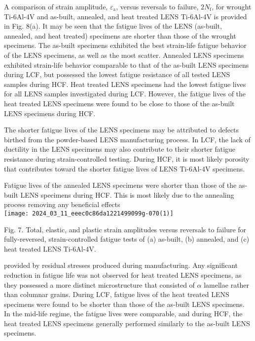 \documentclass[10pt]{article}
\begin{document}
A comparison of strain amplitude, $\varepsilon_{\mathrm{a}}$, versus reversals to failure, $2 N_{\mathrm{f}}$, for wrought Ti-6Al-4V and as-built, annealed, and heat treated LENS Ti-6Al-4V is provided in Fig. 8(a). It may be seen that the fatigue lives of the LENS (as-built, annealed, and heat treated) specimens are shorter than those of the wrought specimens. The as-built specimens exhibited the best strain-life fatigue behavior of the LENS specimens, as well as the most scatter. Annealed LENS specimens exhibited strain-life behavior comparable to that of the as-built LENS specimens during LCF, but possessed the lowest fatigue resistance of all tested LENS samples during HCF. Heat treated LENS specimens had the lowest fatigue lives for all LENS samples investigated during LCF. However, the fatigue lives of the heat treated LENS specimens were found to be close to those of the as-built LENS specimens during HCF.

The shorter fatigue lives of the LENS specimens may be attributed to defects birthed from the powder-based LENS manufacturing process. In LCF, the lack of ductility in the LENS specimens may also contribute to their shorter fatigue resistance during strain-controlled testing. During HCF, it is most likely porosity that contributes toward the shorter fatigue lives of LENS Ti-6Al-4V specimens.

Fatigue lives of the annealed LENS specimens were shorter than those of the as-built LENS specimens during HCF. This is most likely due to the annealing process removing any beneficial effects\\
\texttt{[image: 2024\_03\_11\_eeec0c86da1221499099g-070(1)]}

Fig. 7. Total, elastic, and plastic strain amplitudes versus reversals to failure for fully-reversed, strain-controlled fatigue tests of (a) as-built, (b) annealed, and (c) heat treated LENS Ti-6Al-4V.

provided by residual stresses produced during manufacturing. Any significant reduction in fatigue life was not observed for heat treated LENS specimens, as they possessed a more distinct microstructure that consisted of $\alpha$ lamellae rather than columnar grains. During LCF, fatigue lives of the heat treated LENS specimens were found to be shorter than those of the as-built LENS specimens. In the mid-life regime, the fatigue lives were comparable, and during HCF, the heat treated LENS specimens generally performed similarly to the as-built LENS specimens.
\end{document}
